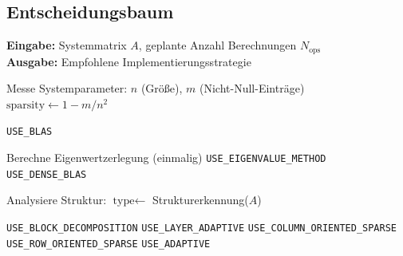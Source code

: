 \documentclass[a4paper,12pt]{report}
\theoremstyle{definition}
\begin{document}
	\subsection{Entscheidungsbaum}
	
	\begin{algorithm}[H]
		\caption{Strategie-Auswahl für Matrix-basierte Systeme}
		\label{alg:final-decision-tree}
		\textbf{Eingabe:} Systemmatrix $A$, geplante Anzahl Berechnungen $N_{\text{ops}}$ \\
		\textbf{Ausgabe:} Empfohlene Implementierungsstrategie
		\begin{algorithmic}[1]
			\State Messe Systemparameter: $n$ (Größe), $m$ (Nicht-Null-Einträge)
			\State $\text{sparsity} \gets 1 - m/n^2$
			
			\State \Return \texttt{USE\_BLAS} 
			\EndIf
			
			\State Berechne Eigenwertzerlegung (einmalig)
			\State \Return \texttt{USE\_EIGENVALUE\_METHOD}
			\Else
			\State \Return \texttt{USE\_DENSE\_BLAS}
			\EndIf
			\EndIf
			
			\State Analysiere Struktur: $\text{type} \gets $ Strukturerkennung($A$)
			
			\State \Return \texttt{USE\_BLOCK\_DECOMPOSITION}
			\State \Return \texttt{USE\_LAYER\_ADAPTIVE}
			\State \Return \texttt{USE\_COLUMN\_ORIENTED\_SPARSE}
			\Else
			\State \Return \texttt{USE\_ROW\_ORIENTED\_SPARSE}
			\EndIf
			\Else
			\State \Return \texttt{USE\_ADAPTIVE} 
			\EndIf
		\end{algorithmic}
	\end{algorithm}
\end{document}
